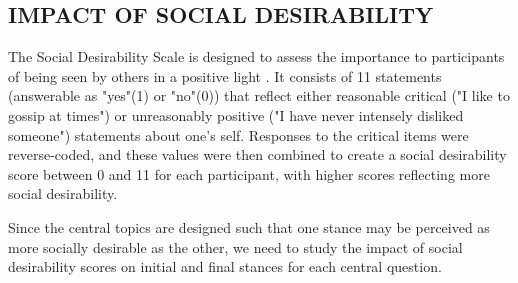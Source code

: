\documentclass[journal]{IEEEtran}
\begin{document}
\subsection{IMPACT OF SOCIAL DESIRABILITY}
The Social Desirability Scale is designed to assess the importance to participants of being seen by others in a positive light \cite{social-desirability}. It consists of 11 statements (answerable as "yes"(1) or "no"(0)) that reflect either reasonable critical ("I like to gossip at times") or unreasonably positive ("I have never intensely disliked someone") statements about one's self. Responses to the critical items were reverse-coded, and these values were then combined to create a social desirability score between 0 and 11 for each participant, with higher scores reflecting more social desirability.

Since the central topics are designed such that one stance may be perceived as more socially desirable as the other, we need to study the impact of social desirability scores on initial and final stances for each central question.
\end{document}

